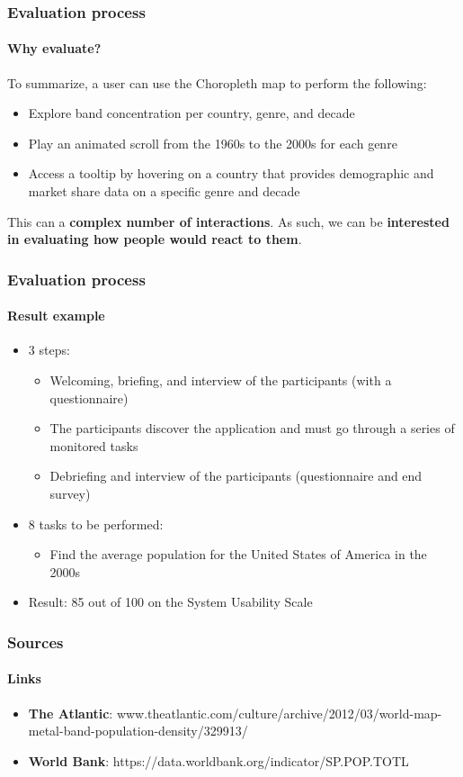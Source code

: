 \documentclass[aspectratio=43,10pt]{beamer}
\begin{document}
\begin{frame}
    \frametitle{Evaluation process}
    \framesubtitle{Why evaluate?}
    To summarize, a user can use the Choropleth map to perform the following:
    \begin{itemize}
        \item Explore band concentration per country, genre, and decade
        \item Play an animated scroll from the 1960s to the 2000s for each genre
        \item Access a tooltip by hovering on a country that provides demographic and market share data on a specific genre and decade
    \end{itemize}
    This can a \textbf{complex number of interactions}. As such, we can be \textbf{interested in evaluating how people would react to them}.
\end{frame}

\begin{frame}
    \frametitle{Evaluation process}
    \framesubtitle{Result example}
    \begin{itemize}
        \item 3 steps:
        \begin{itemize}
        \item Welcoming, briefing, and interview of the participants (with a questionnaire)
        \item The participants discover the application and must go through a series of monitored tasks
        \item Debriefing and interview of the participants (questionnaire and end survey)
        \end{itemize}
        \item 8 tasks to be performed:
        \begin{itemize}
            \item Find the average population for the United States of America in the 2000s
        \end{itemize}
        \item Result: 85 out of 100 on the System Usability Scale
    \end{itemize}
\end{frame}

\begin{frame}
    \frametitle{Sources}
    \framesubtitle{Links}
    \begin{itemize}
        \item \textbf{The Atlantic}: www.theatlantic.com/culture/archive/2012/03/world-map-metal-band-population-density/329913/
        \item \textbf{World Bank}: https://data.worldbank.org/indicator/SP.POP.TOTL
    \end{itemize}
\end{frame}

\end{document}
